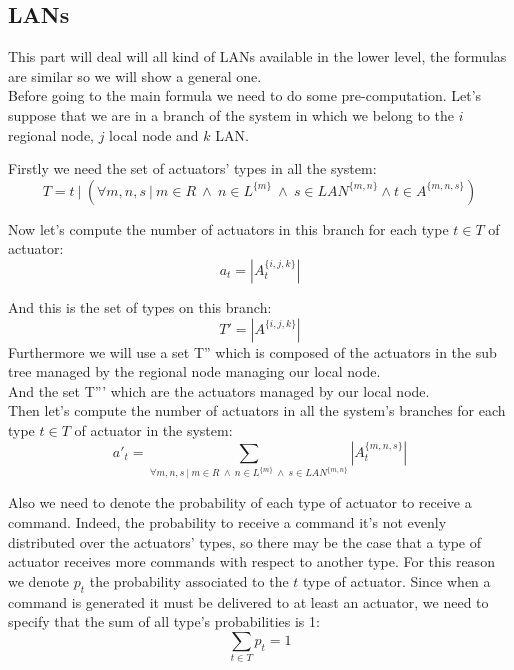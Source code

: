 \documentclass[11pt]{article}
\begin{document}


\subsection{LANs}
This part will deal will all kind of LANs available in the lower level, the formulas are similar so we will show a general one.\\
Before going to the main formula we need to do some pre-computation.
Let's suppose that we are in a branch of the system in which we belong to the $i$ regional node, $j$ local node and $k$ LAN.

Firstly we need the set of actuators' types in all the system:
\begin{equation}
    T = t \ | \ (\forall m,n,s \ | \ m \in R \ \land \ n \in L^{\{m\}} \ \land \ s \in LAN^{\{m, n\}} \land t \in A^{\{m,n,s\}})
\end{equation}

Now let's compute the number of actuators in this branch for each type $t \in T$ of actuator:
\begin{equation}
    a_{t} = | A^{\{i, j, k\}}_{t} | 
\end{equation}

And this is the set of types on this branch:
\begin{equation}
    T' = | A^{\{i, j, k\}} | 
\end{equation}
Furthermore we will use a set T'' which is composed of the actuators in the sub tree managed by the regional node managing our local node.\\
And the set T''' which are the actuators managed by our local node.\\


Then let's compute the number of actuators in all the system's branches for each type $t \in T$ of actuator in the system:
\begin{equation}
    a'_{t} = \sum_{\forall m,n,s \ | \ m \in R \ \land \ n \in L^{\{m\}} \ \land \ s \in LAN^{\{m, n\}}}{ |A^{\{m, n, s\}}_{t}| }
\end{equation}


Also we need to denote the probability of each type of actuator to receive a command. Indeed, the probability to receive a command it's not evenly distributed over the actuators' types, so there may be the case that a type of actuator receives more commands with respect to another type.
For this reason we denote $p_t$ the probability associated to the $t$ type of actuator.
Since when a command is generated it must be delivered to at least an actuator, we need to specify that the sum of all type's probabilities is 1:
\begin{equation}
    \sum_{t \in T}{p_t} = 1
\end{equation}
\end{document}
